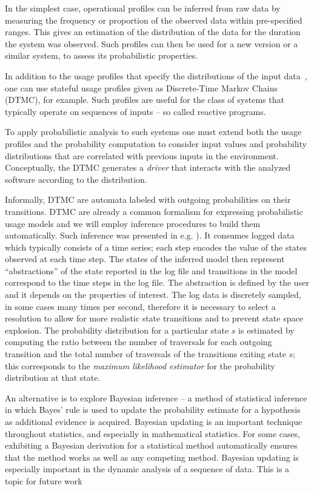 In the simplest case, operational profiles can be inferred from raw
data by measuring the frequency or proportion of the observed data
within pre-specified ranges.  This gives an estimation of the
distribution of the data for the duration the system was observed.
Such profiles can then be used for a new version or a similar system,
to assess its probabilistic properties.

In addition to the usage profiles that specify the distributions of
the input data~\cite{filieri2013reliability}, one can use stateful usage profiles
given as Discrete-Time Markov Chains (DTMC), for example.  Such
profiles are useful for the class of systems that typically operate on
sequences of inputs -- so called reactive programs.

To apply probabilistic analysis to such systems one must extend both
the usage profiles and the probability computation to consider input
values and probability distributions that are correlated with previous
inputs in the environment.  Conceptually, the DTMC generates a
\textit{driver} that interacts with the analyzed software according to
the distribution.

Informally, DTMC are automata labeled with outgoing probabilities on
their transitions.  DTMC are already a common formalism for expressing
probabilistic usage models and we will employ inference procedures to
build them automatically.  Such inference was presented in
e.g. \cite{ghezzi2014mining,beschastnikh2011leveraging}). It consumes logged data
which typically consists of a time series; each step encodes the value
of the states observed at each time step. The states of the inferred
model then represent ``abstractions'' of the state reported in the log
file and transitions in the model correspond to the time steps in the
log file. The abstraction is defined by the user and it depends on the
properties of interest. The log data is discretely sampled, in some
cases many times per second, therefore it is necessary to select a
resolution to allow for more realistic state transitions and to
prevent state space explosion. The probability distribution for a
particular state $s$ is estimated by computing the ratio between the
number of traversals for each outgoing transition and the total number
of traversals of the transitions exiting state $s$; this corresponds
to the {\em maximum likelihood estimator} for the probability
distribution at that state.

An alternative is to explore Bayesian inference -- a method of
statistical inference in which Bayes' rule is used to update the
probability estimate for a hypothesis as additional evidence is
acquired. Bayesian updating is an important technique throughout
statistics, and especially in mathematical statistics. For some cases,
exhibiting a Bayesian derivation for a statistical method
automatically ensures that the method works as well as any competing
method. Bayesian updating is especially important in the dynamic
analysis of a sequence of data. This is a topic for future work



